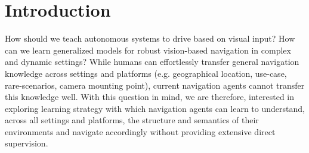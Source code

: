 \documentclass[12pt, letterpaper,cleardoubleempty,BCOR1cm]{scrbook}
\begin{document}
\tableofcontents





%


\chapter{Introduction}
\label{sec:org1cf3344}
How should we teach autonomous systems to drive based on visual input? How can
we learn generalized models for robust vision-based navigation in complex and
dynamic settings? While humans can effortlessly transfer general navigation
knowledge across settings and platforms (e.g. geographical location, use-case,
rare-scenarios, camera mounting point), current navigation agents cannot
transfer this knowledge well. With this question in mind, we are therefore,
interested in exploring learning strategy with which navigation agents can learn
to understand, across all settings and platforms, the structure and semantics of
their environments and navigate accordingly without providing extensive direct
supervision.
\end{document}
